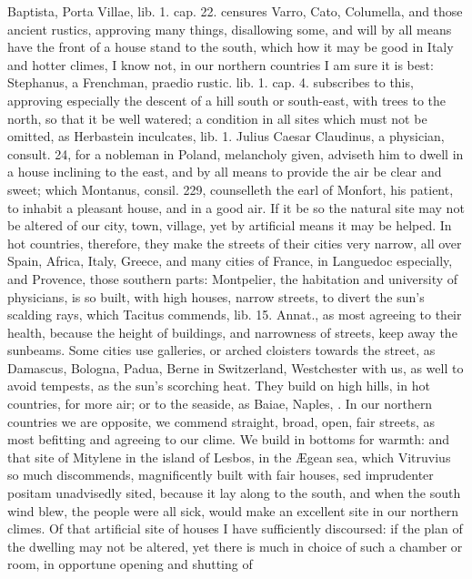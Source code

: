 {Baptista, Porta Villae, lib. 1. cap. 22. censures Varro, Cato,
Columella, and those ancient rustics, approving many things,
disallowing some, and will by all means have the front of a house stand
to the south, which how it may be good in Italy and hotter climes, I
know not, in our northern countries I am sure it is best: Stephanus, a
Frenchman, praedio rustic. lib. 1. cap. 4. subscribes to this,
approving especially the descent of a hill south or south-east, with
trees to the north, so that it be well watered; a condition in all
sites which must not be omitted, as Herbastein inculcates, lib. 1.
Julius Caesar Claudinus, a physician, consult. 24, for a nobleman in
Poland, melancholy given, adviseth him to dwell in a house inclining to
the east, and by all means to provide the air be clear and
sweet; which Montanus, consil. 229, counselleth the earl of Monfort,
his patient, to inhabit a pleasant house, and in a good air. If it be
so the natural site may not be altered of our city, town, village, yet
by artificial means it may be helped. In hot countries, therefore, they
make the streets of their cities very narrow, all over Spain, Africa,
Italy, Greece, and many cities of France, in Languedoc especially, and
Provence, those southern parts: Montpelier, the habitation and
university of physicians, is so built, with high houses, narrow
streets, to divert the sun's scalding rays, which Tacitus commends,
lib. 15. Annat., as most agreeing to their health, because the
height of buildings, and narrowness of streets, keep away the sunbeams.
Some cities use galleries, or arched cloisters towards the street, as
Damascus, Bologna, Padua, Berne in Switzerland, Westchester with us, as
well to avoid tempests, as the sun's scorching heat. They build on high
hills, in hot countries, for more air; or to the seaside, as Baiae,
Naples, \etc{}. In our northern countries we are opposite, we commend
straight, broad, open, fair streets, as most befitting and agreeing to
our clime. We build in bottoms for warmth: and that site of Mitylene in
the island of Lesbos, in the \AE{}gean sea, which Vitruvius so much
discommends, magnificently built with fair houses, sed imprudenter
positam unadvisedly sited, because it lay along to the south, and when
the south wind blew, the people were all sick, would make an excellent
site in our northern climes.
Of that artificial site of houses I have sufficiently discoursed: if
the plan of the dwelling may not be altered, yet there is much in
choice of such a chamber or room, in opportune opening and shutting of
}

